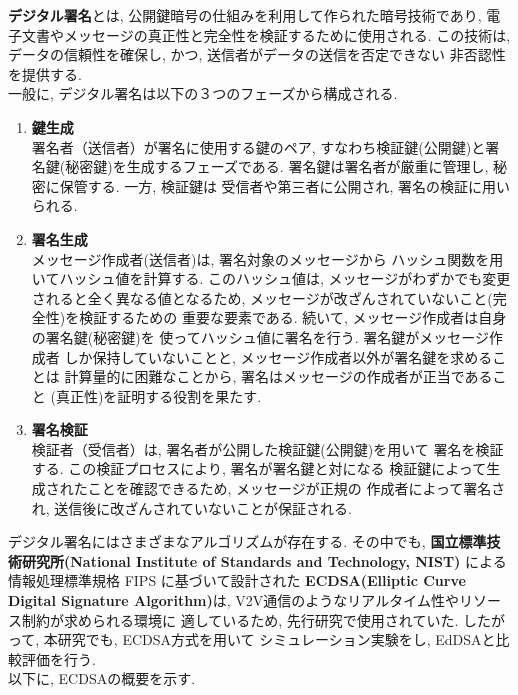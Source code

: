 \textbf{デジタル署名}とは, 公開鍵暗号の仕組みを利用して作られた暗号技術であり, 
電子文書やメッセージの真正性と完全性を検証するために使用される. 
この技術は, データの信頼性を確保し, かつ, 送信者がデータの送信を否定できない
非否認性を提供する.\\
\indent 一般に, デジタル署名は以下の３つのフェーズから構成される.

\begin{enumerate}
  \item \textbf{鍵生成}\\
  \indent 署名者（送信者）が署名に使用する鍵のペア, 
  すなわち検証鍵(公開鍵)と署名鍵(秘密鍵)を生成するフェーズである. 
  署名鍵は署名者が厳重に管理し, 秘密に保管する. 一方, 検証鍵は
  受信者や第三者に公開され, 署名の検証に用いられる.
  \item \textbf{署名生成}\\
  \indent メッセージ作成者(送信者)は, 署名対象のメッセージから
  ハッシュ関数を用いてハッシュ値を計算する. このハッシュ値は, 
  メッセージがわずかでも変更されると全く異なる値となるため, 
  メッセージが改ざんされていないこと(完全性)を検証するための
  重要な要素である. 続いて, メッセージ作成者は自身の署名鍵(秘密鍵)を
  使ってハッシュ値に署名を行う. 署名鍵がメッセージ作成者
  しか保持していないことと, メッセージ作成者以外が署名鍵を求めることは
  計算量的に困難なことから, 署名はメッセージの作成者が正当であること
  (真正性)を証明する役割を果たす. 
  \item \textbf{署名検証}\\
  \indent 検証者（受信者）は, 署名者が公開した検証鍵(公開鍵)を用いて
  署名を検証する. この検証プロセスにより, 署名が署名鍵と対になる
  検証鍵によって生成されたことを確認できるため, メッセージが正規の
  作成者によって署名され, 送信後に改ざんされていないことが保証される.
\end{enumerate}

デジタル署名にはさまざまなアルゴリズムが存在する. その中でも,    
\textbf{国立標準技術研究所(National Institute of Standards and Technology, NIST)}
による情報処理標準規格 FIPS に基づいて設計された
\textbf{ECDSA(Elliptic Curve Digital Signature Algorithm)}は, 
V2V通信のようなリアルタイム性やリソース制約が求められる環境に
適しているため, 先行研究\cite{shinato}で使用されていた. 
したがって, 本研究でも, ECDSA方式を用いて
シミュレーション実験をし, EdDSAと比較評価を行う. \\
以下に, ECDSAの概要を示す. \\[1em] 


% 
\\
